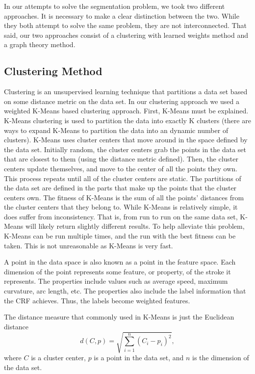 In our attempts to solve the segmentation problem, we took two different approaches.
It is necessary to make a clear distinction between the two.
While they both attempt to solve the same problem, they are not interconnected.
That said, our two approaches consist of a clustering with learned weights method and a graph theory method.

\subsection{Clustering Method}
Clustering is an unsupervised learning technique that partitions a data set based on some distance metric on the data set.
In our clustering approach we used a weighted K-Means based clustering approach.
First, K-Means must be explained.
K-Means clustering is used to partition the data into exactly K clusters (there are ways to expand K-Means to partition the data into an dynamic number of clusters).
K-Means uses cluster centers that move around in the space defined by the data set.
Initially random, the cluster centers grab the points in the data set that are closest to them (using the distance metric defined).
Then, the cluster centers update themselves, and move to the center of all the points they own.
This process repeats until all of the cluster centers are static.
The partitions of the data set are defined in the parts that make up the points that the cluster centers own.
The fitness of K-Means is the sum of all the points' distances from the cluster centers that they belong to.
While K-Means is relatively simple, it does suffer from inconsistency.
That is, from run to run on the same data set, K-Means will likely return slightly different results.
To help alleviate this problem, K-Means can be run multiple times, and the run with the best fitness can be taken.
This is not unreasonable as K-Means is very fast.

A point in the data space is also known as a point in the feature space.  
Each dimension of the point represents some feature, or property, of the stroke it represents.
The properties include values such as average speed, maximum curvature, arc length, etc.
The properties also include the label information that the CRF achieves.
Thus, the labels become weighted features.

The distance measure that commonly used in K-Means is just the Euclidean distance
$$
d(C, p) = \sqrt{\sum_{i=1}^{n} (C_i - p_i)^2},
$$
where $C$ is a cluster center, $p$ is a point in the data set, and $n$ is the dimension of the data set.

